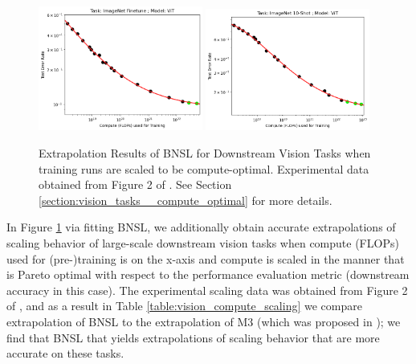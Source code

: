 \documentclass{article} %
\begin{document}
\begin{figure}[htbp]
    \centering
\includegraphics[width=0.48\textwidth]{figures/compute/vision/Task_ImageNet_Finetune__Model_ViT__BNSL.png}
\includegraphics[width=0.48\textwidth]{figures/compute/vision/Task_ImageNet_10-Shot__Model_ViT__BNSL.png}
\vspace{-3.5mm}
    \caption{
Extrapolation Results of BNSL for Downstream Vision Tasks when training runs are scaled to be compute-optimal. Experimental data obtained from Figure 2 of \cite{DBLP:journals/corr/abs-2106-04560}. See Section \ref{section:vision_tasks__compute_optimal} for more details.
    }
    \label{fig:vision_compute_scaling}
\end{figure}

In Figure \ref{fig:vision_compute_scaling} via fitting BNSL, we additionally obtain accurate extrapolations of scaling behavior of large-scale downstream vision tasks when compute (FLOPs) used for (pre-)training is on the x-axis and compute is scaled in the manner that is Pareto optimal with respect to the performance evaluation metric (downstream accuracy in this case). The experimental scaling data was obtained from Figure 2 of \cite{DBLP:journals/corr/abs-2106-04560}, and as a result in Table \ref{table:vision_compute_scaling} we compare extrapolation of BNSL to the extrapolation of M3 (which was proposed in \cite{DBLP:journals/corr/abs-2106-04560}); we find that BNSL that yields extrapolations of scaling behavior that are more accurate on these tasks.
\end{document}
